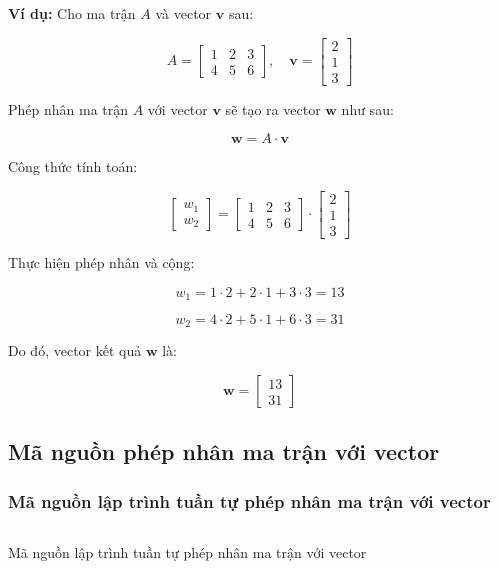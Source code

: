 \textbf{Ví dụ:}
Cho ma trận \( A \) và vector \( \mathbf{v} \) sau:

\[ A = \begin{bmatrix} 1 & 2 & 3 \\ 4 & 5 & 6 \end{bmatrix}, \quad \mathbf{v} = \begin{bmatrix} 2 \\ 1 \\ 3 \end{bmatrix} \]

Phép nhân ma trận \( A \) với vector \( \mathbf{v} \) sẽ tạo ra vector \( \mathbf{w} \) như sau:

\[ \mathbf{w} = A \cdot \mathbf{v} \]

Công thức tính toán:

\[ \begin{bmatrix} w_1 \\ w_2 \end{bmatrix} = \begin{bmatrix} 1 & 2 & 3 \\ 4 & 5 & 6 \end{bmatrix} \cdot \begin{bmatrix} 2 \\ 1 \\ 3 \end{bmatrix} \]

Thực hiện phép nhân và cộng:

\[ w_1 = 1 \cdot 2 + 2 \cdot 1 + 3 \cdot 3 = 13 \]

\[ w_2 = 4 \cdot 2 + 5 \cdot 1 + 6 \cdot 3 = 31 \]

Do đó, vector kết quả \( \mathbf{w} \) là:

\[ \mathbf{w} = \begin{bmatrix} 13 \\ 31 \end{bmatrix} \]

\subsection{Mã nguồn phép nhân ma trận với vector}

\subsubsection{Mã nguồn lập trình tuần tự phép nhân ma trận với vector}
\begin{listing}[H]
 \centering
 \inputminted{cpp}{sources/MaNguon1TT.cpp}
 \caption{Mã nguồn lập trình tuần tự phép nhân ma trận với vector}
 \label{code:MaNguon1TT}
\end{listing}

